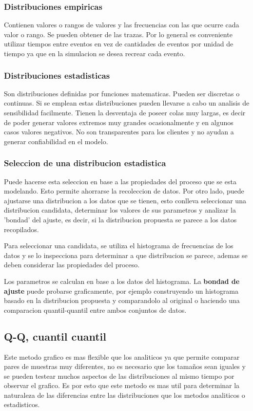 \documentclass[a4paper]{article}
\begin{document}
\subsubsection*{Distribuciones empiricas}
Contienen valores o rangos de valores y las frecuencias con las que ocurre cada valor o rango.
Se pueden obtener de las trazas.
Por lo general es conveniente utilizar tiempos entre eventos en vez de cantidades de eventos por
unidad de tiempo ya que en la simulacion se desea recrear cada evento.

\subsubsection*{Distribuciones estadisticas}
Son distribuciones definidas por funciones matematicas. Pueden ser discretas o continuas.
Si se emplean estas distribuciones pueden llevarse a cabo un analisis de sensibilidad 
facilmente. Tienen la desventaja de poseer colas muy largas, es decir de poder generar
valores extremos muy grandes ocasionalmente y en algunos casos valores negativos.
No son transparentes para los clientes y no ayudan a generar confiabilidad en el modelo.

\subsubsection*{Seleccion de una distribucion estadistica}
Puede hacerse esta seleccion en base a las propiedades del proceso que se esta modelando.
Esto permite ahorrarse la recoleccion de datos.
Por otro lado, puede ajustarse una distribucion a los datos que se tienen, esto conlleva 
seleccionar una distribucion candidata, determinar los valores de sus parametros y analizar
la 'bondad' del ajuste, es decir, si la distribucion propuesta se parece a los datos recopilados.

Para seleccionar una candidata, se utiliza el histograma de frecuencias de los datos y se lo 
inspecciona para determinar a que distribucion se parece, ademas se deben considerar las propiedades 
del proceso.

Los parametros se calculan en base a los datos del histograma.
La \textbf{bondad de ajuste} puede probarse graficamente, por ejemplo construyendo un histograma basado en la
distribucion propuesta y comparandolo al original o haciendo una comparacion quantil-quantil entre ambos
conjuntos de datos.

\subsection*{Q-Q, cuantil cuantil}
Este metodo grafico es mas flexible que los analiticos ya que permite comparar pares de muestras muy diferentes, no es necesario que 
los tamaños sean iguales y se pueden testear muchos aspectos de las distribuciones al mismo tiempo por observar el grafico.
Es por esto que este metodo es mas util para determinar la naturaleza de las diferencias entre las distribuciones
que los metodos analiticos o estadisticos.
\end{document}
